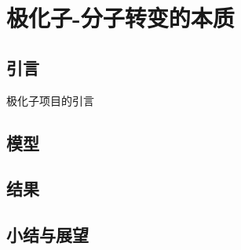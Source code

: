 \chapter{极化子-分子转变的本质}\label{chap:polaron}

\section{引言}

极化子项目的引言

\section{模型}\label{sec:system}

\section{结果}

\section{小结与展望}

